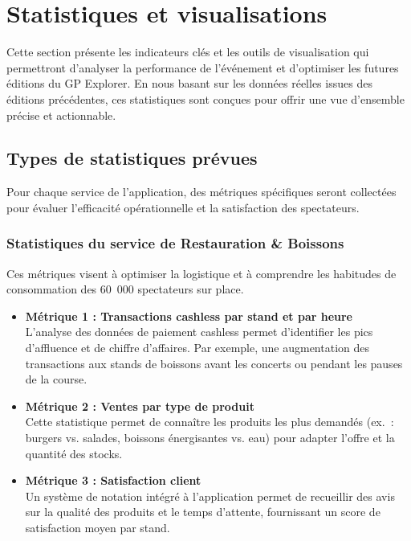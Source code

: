 \documentclass[12pt,a4paper]{article}
\begin{document}
\newpage
\section{Statistiques et visualisations}

Cette section présente les indicateurs clés et les outils de visualisation qui permettront d'analyser la performance de l'événement et d'optimiser les futures éditions du GP Explorer. En nous basant sur les données réelles issues des éditions précédentes, ces statistiques sont conçues pour offrir une vue d'ensemble précise et actionnable.

\subsection{Types de statistiques prévues}

Pour chaque service de l'application, des métriques spécifiques seront collectées pour évaluer l'efficacité opérationnelle et la satisfaction des spectateurs.

\subsubsection{Statistiques du service de Restauration \& Boissons}

Ces métriques visent à optimiser la logistique et à comprendre les habitudes de consommation des 60~000 spectateurs sur place.

\begin{itemize}
    \item \textbf{Métrique 1 : Transactions cashless par stand et par heure} \\
    L'analyse des données de paiement cashless permet d'identifier les pics d'affluence et de chiffre d'affaires. Par exemple, une augmentation des transactions aux stands de boissons avant les concerts ou pendant les pauses de la course.

    \item \textbf{Métrique 2 : Ventes par type de produit} \\
    Cette statistique permet de connaître les produits les plus demandés (ex.~: burgers vs. salades, boissons énergisantes vs. eau) pour adapter l'offre et la quantité des stocks.

    \item \textbf{Métrique 3 : Satisfaction client} \\
    Un système de notation intégré à l'application permet de recueillir des avis sur la qualité des produits et le temps d'attente, fournissant un score de satisfaction moyen par stand.
\end{itemize}
\end{document}
